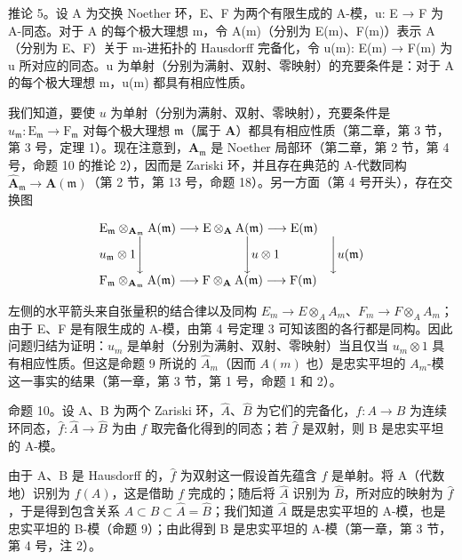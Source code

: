 推论 5。设 A 为交换 Noether 环，E、F 为两个有限生成的 A-模，u: E → F 为 A-同态。对于 A 的每个极大理想 m，令 A(m)（分别为 E(m)、F(m)）表示 A（分别为 E、F）关于 m-进拓扑的 Hausdorff 完备化，令 u(m): E(m) → F(m) 为 u 所对应的同态。u 为单射（分别为满射、双射、零映射）的充要条件是：对于 A 的每个极大理想 m，u(m) 都具有相应性质。

我们知道，要使 \(u\) 为单射（分别为满射、双射、零映射），充要条件是 \(u_{\mathfrak{m}}: \mathrm{E}_{\mathfrak{m}} \to \mathrm{F}_{\mathfrak{m}}\) 对每个极大理想 \(\mathfrak{m}\)（属于 \(\mathbf{A}\)）都具有相应性质（第二章，第 3 节，第 3 号，定理 1）。现在注意到，\(\mathbf{A}_{\mathfrak{m}}\) 是 Noether 局部环（第二章，第 2 节，第 4 号，命题 10 的推论 2），因而是 Zariski 环，并且存在典范的 A-代数同构 \(\hat{\mathbf{A}}_{\mathfrak{m}} \to \mathbf{A}(\mathfrak{m})\)（第 2 节，第 13 号，命题 18）。另一方面（第 4 号开头），存在交换图

\[
\begin{array}{l} \mathrm{E} _ {\mathfrak {m}} \otimes_ {\mathbf {A} _ {\mathfrak {m}}} \mathrm{A} (\mathfrak {m}) \longrightarrow \mathrm{E} \otimes_ {\mathbf {A}} \mathrm{A} (\mathfrak {m}) \longrightarrow \mathrm{E} (\mathfrak {m}) \\ u _ {\mathfrak {m}} \otimes 1 \Biggl \downarrow \qquad \qquad \qquad \qquad \Biggl \downarrow u \otimes 1 \qquad \qquad \Biggl \downarrow u (\mathfrak {m}) \\ \mathrm{F} _ {\mathfrak {m}} \otimes_ {\mathbf {A} _ {\mathfrak {m}}} \mathrm{A} (\mathfrak {m}) \longrightarrow \mathrm{F} \otimes_ {\mathbf {A}} \mathrm{A} (\mathfrak {m}) \longrightarrow \mathrm{F} (\mathfrak {m}) \end{array}
\]

左侧的水平箭头来自张量积的结合律以及同构 \(E_{m} \rightarrow E \otimes_{A} A_{m}\)、\(F_{m} \rightarrow F \otimes_{A} A_{m}\)；由于 E、F 是有限生成的 A-模，由第 4 号定理 3 可知该图的各行都是同构。因此问题归结为证明：\(u_{m}\) 是单射（分别为满射、双射、零映射）当且仅当 \(u_{m} \otimes 1\) 具有相应性质。但这是命题 9 所说的 \(\hat{A}_{m}\)（因而 \(A(m)\) 也）是忠实平坦的 \(A_{m}\)-模这一事实的结果（第一章，第 3 节，第 1 号，命题 1 和 2）。

命题 10。设 A、B 为两个 Zariski 环，\(\hat{A}\)、\(\hat{B}\) 为它们的完备化，\(f\colon A\to B\) 为连续环同态，\(\hat{f}\colon\hat{A}\to\hat{B}\) 为由 \(f\) 取完备化得到的同态；若 \(\hat{f}\) 是双射，则 B 是忠实平坦的 A-模。

由于 A、B 是 Hausdorff 的，\(\hat{f}\) 为双射这一假设首先蕴含 \(f\) 是单射。将 A（代数地）识别为 \(f(A)\)，这是借助 \(f\) 完成的；随后将 \(\hat{A}\) 识别为 \(\hat{B}\)，所对应的映射为 \(\hat{f}\)，于是得到包含关系 \(A \subset B \subset \hat{A} = \hat{B}\)；我们知道 \(\hat{A}\) 既是忠实平坦的 A-模，也是忠实平坦的 B-模（命题 9）；由此得到 B 是忠实平坦的 A-模（第一章，第 3 节，第 4 号，注 2）。

